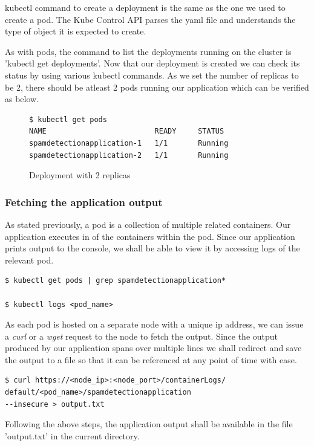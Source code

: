\documentclass[9pt,twocolumn,twoside]{../../styles/osajnl}
\begin{document}
{\noindent
kubectl command to create a deployment is the same as the one we used
to create a pod. The Kube Control API parses the yaml file and
understands the type of object it is expected to create.

\noindent
As with pods, the command to list the deployments running on the
cluster is 'kubectl get deployments'. Now that our deployment is
created we can check its status by using various kubectl commands. As
we set the number of replicas to be 2, there should be atleast 2 pods
running our application which can be verified as below.

\begin{figure}[H]
\begin{verbatim}
$ kubectl get pods
NAME                         READY     STATUS        
spamdetectionapplication-1   1/1       Running  
spamdetectionapplication-2   1/1       Running
\end{verbatim}
\caption{Deployment with 2 replicas}
\label{Deployment with 2 replicas}
\end{figure}

\subsubsection{Fetching the application output}
As stated previously, a pod is a collection of multiple related
containers. Our application executes in of the containers within the
pod. Since our application prints output to the console, we shall be
able to view it by accessing logs of the relevant pod.

\begin{verbatim}
$ kubectl get pods | grep spamdetectionapplication*

$ kubectl logs <pod_name>
\end{verbatim}

\noindent
As each pod is hosted on a separate node with a unique ip address, we
can issue a \emph{curl} or a \emph{wget} request to the node to fetch
the output.  Since the output produced by our application spans over
multiple lines we shall redirect and save the output to a file so that
it can be referenced at any point of time with ease.

\begin{verbatim}
$ curl https://<node_ip>:<node_port>/containerLogs/
default/<pod_name>/spamdetectionapplication 
--insecure > output.txt
\end{verbatim}

\noindent
Following the above steps, the application output shall be available
in the file 'output.txt' in the current directory.

}
\end{document}
